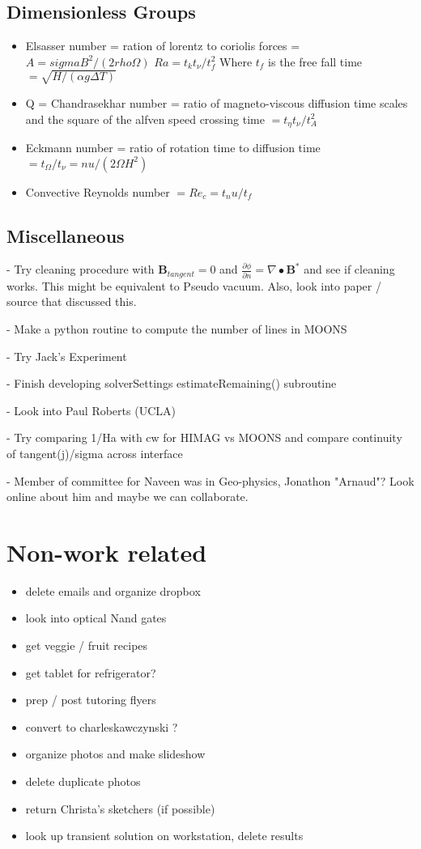 \documentclass[11pt]{article}
\begin{document}
\subsection{Dimensionless Groups}
\begin{itemize}
\setlength\itemsep{-1em}
\item Elsasser number = ration of lorentz to coriolis forces = $A = sigma B^2 / (2 rho \Omega)$
$Ra = t_k t_{\nu} / t_f^2$ Where $t_f$ is the free fall time $ = \sqrt{ H/(\alpha g \Delta T)} $
\item Q = Chandrasekhar number = ratio of magneto-viscous diffusion time scales and the square of the alfven speed crossing time $ = t_{\eta} t_{\nu} / t_A^2$
\item Eckmann number = ratio of rotation time to diffusion time $ = t_{\Omega} / t_{\nu} = nu / (2 \Omega H^2)$
\item Convective Reynolds number $= Re_c = t_nu / t_f$
\end{itemize}


\subsection{Miscellaneous}

- Try cleaning procedure with $\mathbf{B}_{tangent}=0$ and $\frac{\partial \phi}{\partial n} = \nabla \bullet \mathbf{B}^*$ and see if cleaning works. This might be equivalent to Pseudo vacuum. Also, look into paper / source that discussed this.

- Make a python routine to compute the number of lines in MOONS

- Try Jack's Experiment

- Finish developing solverSettings estimateRemaining() subroutine

- Look into Paul Roberts (UCLA)

- Try comparing 1/Ha with cw for HIMAG vs MOONS and compare continuity of tangent(j)/sigma across interface

- Member of committee for Naveen was in Geo-physics, Jonathon "Arnaud"? Look online about him and maybe we can collaborate.

\newpage
\section{Non-work related}
\begin{itemize}
\setlength\itemsep{-1em}
\item delete emails and organize dropbox
\item look into optical Nand gates
\item get veggie / fruit recipes
\item get tablet for refrigerator?
\item prep / post tutoring flyers
\item convert to charleskawczynski ?
\item organize photos and make slideshow
\item delete duplicate photos
\item return Christa's sketchers (if possible)
\item look up transient solution on workstation, delete results
\end{itemize}
\end{document}
